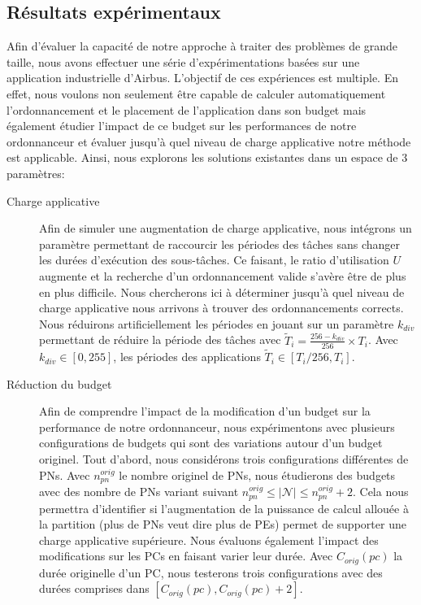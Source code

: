 \documentclass[main.tex]{subfiles}
\begin{document}
\subsection{Résultats expérimentaux}
Afin d'évaluer la capacité de notre approche à traiter des problèmes de grande taille, nous avons effectuer une série d'expérimentations basées sur une application industrielle d'Airbus. L'objectif de ces expériences est multiple. En effet, nous voulons non seulement être capable de calculer automatiquement l'ordonnancement et le placement de l'application dans son budget mais également étudier l'impact de ce budget sur les performances de notre ordonnanceur et évaluer jusqu'à quel niveau de charge applicative notre méthode est applicable. Ainsi, nous explorons les solutions existantes dans un espace de 3 paramètres:
\begin{description}
    \item[Charge applicative]
        Afin de simuler une augmentation de charge applicative, nous intégrons un paramètre permettant de raccourcir les périodes des tâches sans changer les durées d'exécution des sous-tâches. Ce faisant, le ratio d'utilisation $U$ augmente et la recherche d'un ordonnancement valide s'avère être de plus en plus difficile. Nous chercherons ici à déterminer jusqu'à quel niveau de charge applicative nous arrivons à trouver des ordonnancements corrects. Nous réduirons artificiellement les périodes en jouant sur un paramètre $k_{div}$ permettant de réduire la période des tâches avec $\widetilde{T}_i = \frac{256-k_{div}}{256} \times T_i$. Avec $k_{div} \in [ 0 , 255 ]$, les périodes des applications $\widetilde{T}_i \in [ T_i/256 , T_i ]$.
    \item[Réduction du budget]
        Afin de comprendre l'impact de la modification d'un budget sur la performance de notre ordonnanceur, nous expérimentons avec plusieurs configurations de budgets qui sont des variations autour d'un budget originel. Tout d'abord, nous considérons trois configurations différentes de PNs. Avec $n_{pn}^{orig}$ le nombre originel de PNs, nous étudierons des budgets avec des nombre de PNs variant suivant $ n_{pn}^{orig} \leq |\mathcal{N}| \leq n_{pn}^{orig} + 2$. Cela nous permettra d'identifier si l'augmentation de la puissance de calcul allouée à la partition (plus de PNs veut dire plus de PEs) permet de supporter une charge applicative supérieure. Nous évaluons également l'impact des modifications sur les PCs en faisant varier leur durée. Avec $C_{orig}(pc)$ la durée originelle d'un PC, nous testerons trois configurations avec des durées comprises dans $[ C_{orig}(pc) , C_{orig}(pc) +2 ]$.

\end{description}
\end{document}
